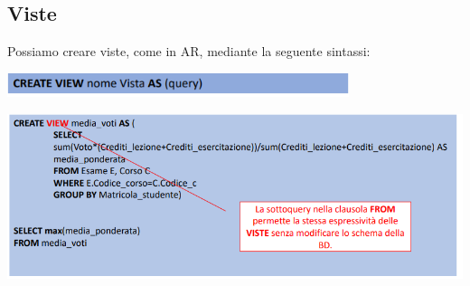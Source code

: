 \documentclass[12pt]{article}
\begin{document}
\subsection{Viste}
Possiamo creare viste, come in AR, mediante la seguente sintassi:
\begin{center}
    \includegraphics[width = 0.75\textwidth]{Images/225.PNG}
\end{center}
\begin{center}
    \includegraphics[width = 1\textwidth]{Images/226.PNG}
\end{center}
\end{document}
